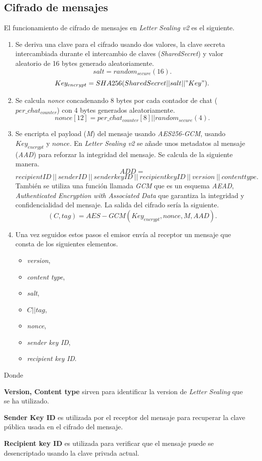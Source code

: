 \subsection{Cifrado de mensajes}
El funcionamiento de cifrado de mensajes en \emph{Letter Sealing v2} es el siguiente.
\begin{enumerate}
	\item Se deriva una clave para el cifrado usando dos valores, la clave secreta intercambiada durante el intercambio de claves (\emph{SharedSecret}) y valor aleatorio de 16 bytes generado aleatoriamente.
		$$
			salt = random_{secure}(16).
		$$
		$$
			Key_{encrypt}=SHA256(SharedSecret||salt||"Key").
		$$
	\item Se calcula \emph{nonce} concadenando 8 bytes por cada contador de chat ($per\_chat_{counter}$) con 4 bytes generados aleatoriamente.
		$$
			nonce[12]=per\_chat_{counter}[8] || random_{secure}(4).
		$$
	\item Se encripta el payload (\emph{M}) del mensaje usando \emph{AES256-GCM}, usando $Key_{encrypt}$ y $nonce$. En \emph{Letter Sealing v2} se añade unos metadatos al mensaje (\emph{AAD}) para reforzar la integridad del mensaje. Se calcula de la siguiente manera.
		$$
			ADD =
		$$
		$$
			 recipientID\:||\: senderID\:||\:senderkeyID\:||\:recipientkeyID\:||\:version\:||\:contenttype.
		$$
		También se utiliza una función llamada \emph{GCM} que es un esquema \emph{AEAD}, \emph{Authenticated Encryption with Associated Data} que garantiza la integridad y confidencialidad del mensaje. La salida del cifrado sería la siguiente.
		$$
			(C,tag) = AES - GCM(Key_{encrypt}, nonce, M, AAD).
		$$
	\item Una vez seguidos estos pasos el emisor envía al receptor un mensaje que consta de los siguientes elementos.\\
	\begin{itemize}
		\item \emph{version},
		\item \emph{content type},
		\item \emph{salt},
		\item $C||tag$,
		\item \emph{nonce},
		\item \emph{sender key ID},
		\item \emph{recipient key ID}.
	\end{itemize}
\end{enumerate}
Donde 
\begin{description}
	\item \textbf{Version, Content type} sirven para identificar la version de \emph{Letter Sealing} que se ha utilizado.
	\item \textbf{Sender Key ID} es utilizada por el receptor del mensaje para recuperar la clave pública usada en el cifrado del mensaje.
	\item \textbf{Recipient key ID} es utilizada para verificar que el mensaje puede se desencriptado usando la clave privada actual.
\end{description}

